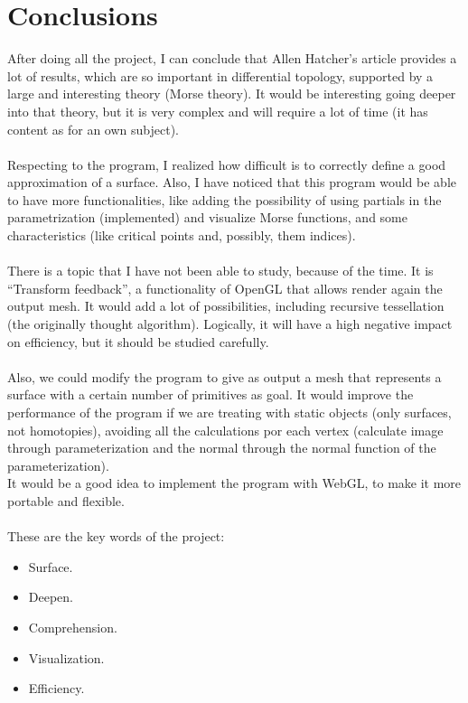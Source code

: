 \section*{Conclusions}
After doing all the project, I can conclude that Allen Hatcher's article \cite{arXiv:1312.3518} provides a lot of results, which are so important in differential topology, supported by a large and interesting theory (Morse theory). It would be interesting going deeper into that theory, but it is very complex and will require a lot of time (it has content as for an own subject).\\
\\Respecting to the program, I realized how difficult is to correctly define a good approximation of a surface. Also, I have noticed that this program would be able to have more functionalities, like adding the possibility of using partials in the parametrization (implemented) and visualize Morse functions, and some characteristics (like critical points and, possibly, them indices).\\
\\There is a topic that I have not been able to study, because of the time. It is ``Transform feedback'', a functionality of OpenGL that allows render again the output mesh. It would add a lot of possibilities, including recursive tessellation (the originally thought algorithm). Logically, it will have a high negative impact on efficiency, but it should be studied carefully.\\
\\Also, we could modify the program to give as output a mesh that represents a surface with a certain number of primitives as goal. It would improve the performance of the program if we are treating with static objects (only surfaces, not homotopies), avoiding all the calculations por each vertex (calculate image through parameterization and the normal through the normal function of the parameterization).
\\It would be a good idea to implement the program with WebGL, to make it more portable and flexible.\\
\\These are the key words of the project:
\begin{itemize}
	\item Surface.
	\item Deepen.
	\item Comprehension.
	\item Visualization.
	\item Efficiency.
\end{itemize}

\endinput
